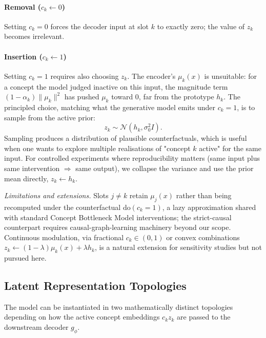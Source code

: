 \documentclass[11pt, a4paper]{article}
\begin{document}
\paragraph{Removal ($c_k \leftarrow 0$)}
Setting $c_k = 0$ forces the decoder input at slot $k$ to exactly zero; the value of $z_k$ becomes irrelevant.

\paragraph{Insertion ($c_k \leftarrow 1$)}
Setting $c_k = 1$ requires also choosing $z_k$. The encoder's $\mu_k(x)$ is unsuitable: for a concept the model judged inactive on this input, the magnitude term $(1 - \alpha_k)\|\mu_k\|^2$ has pushed $\mu_k$ toward $0$, far from the prototype $h_k$. The principled choice, matching what the generative model emits under $c_k = 1$, is to sample from the active prior:
\[
z_k \sim \mathcal{N}(h_k, \sigma_0^2 I).
\]
Sampling produces a distribution of plausible counterfactuals, which is useful when one wants to explore multiple realisations of "concept $k$ active" for the same input. For controlled experiments where reproducibility matters (same input plus same intervention $\Rightarrow$ same output), we collapse the variance and use the prior mean directly, $z_k \leftarrow h_k$.

\textit{Limitations and extensions.} Slots $j \ne k$ retain $\mu_j(x)$ rather than being recomputed under the counterfactual $\mathrm{do}(c_k = 1)$, a lazy approximation shared with standard Concept Bottleneck Model interventions; the strict-causal counterpart requires causal-graph-learning machinery beyond our scope. Continuous modulation, via fractional $c_k \in (0, 1)$ or convex combinations $z_k \leftarrow (1{-}\lambda)\mu_k(x) + \lambda h_k$, is a natural extension for sensitivity studies but not pursued here.

\subsection{Latent Representation Topologies}

The model can be instantiated in two mathematically distinct topologies depending on how the active concept embeddings $c_k z_k$ are passed to the downstream decoder $g_\phi$.
\end{document}
